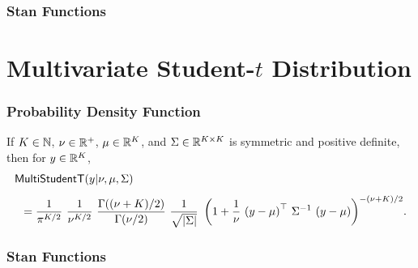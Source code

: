 
\subsubsection{Stan Functions}

\begin{description}
%
%
\end{description}


\section{Multivariate Student-$t$ Distribution}

\subsubsection{Probability Density Function}

If $K \in \mathbb{N}$, $\nu \in \mathbb{R}^+$, $\mu \in \mathbb{R}^K$, and $\Sigma
\in \mathbb{R}^{K \times K}$ is symmetric and positive definite, then for
$y \in \mathbb{R}^K$,
\[
\begin{array}{l}
\mbox{\sf MultiStudentT}(y|\nu,\mu,\Sigma)
\\[8pt]
\displaystyle
\hspace*{8pt}
=
\frac{1}{\pi^{K/2}}
\
\frac{1}{\nu^{K/2}}
\
\frac{\Gamma\!\left((\nu + K)/2\right)}
     {\Gamma(\nu/2)}
\
\frac{1}{\sqrt{\left| \Sigma \right|}}
\
\left(
1 + \frac{1}{\nu} \, \left(y - \mu\right)^{\top} \, \Sigma^{-1} \, \left(y - \mu\right)
\right)^{-(\nu + K)/2}
\! .
\end{array}
\]
\vspace*{4pt}



\subsubsection{Stan Functions}

